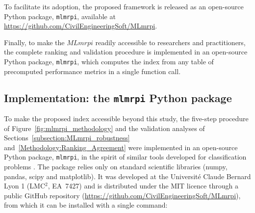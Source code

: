 
To facilitate its adoption, the proposed framework is released as an open-source
Python package, \texttt{mlmrpi}, available at
\url{https://github.com/CivilEngineeringSoft/MLmrpi}.

Finally, to make the $MLmrpi$ readily accessible to researchers and practitioners,
the complete ranking and validation procedure is implemented in an open-source
Python package, \texttt{mlmrpi}, which computes the index from any table of
precomputed performance metrics in a single function call.

\subsection{Implementation: the \texttt{mlmrpi} Python package}\label{Methodology:MLmrpi_package}

To make the proposed index accessible beyond this study, the five-step procedure
of Figure~\ref{fig:mlmrpi_methodology} and the validation analyses of
Sections~\ref{subsection:MLmrpi_robustness} and~\ref{Methodology:Ranking_Agreement}
were implemented in an open-source Python package, \texttt{mlmrpi}, in the spirit
of similar tools developed for classification problems \citep{Akshay2023}. The
package relies only on standard scientific libraries (numpy, pandas, scipy and
matplotlib). It was developed at the Université Claude Bernard Lyon 1 (LMC$^2$,
EA~7427) and is distributed under the MIT licence through a public GitHub
repository (\url{https://github.com/CivilEngineeringSoft/MLmrpi}), from which it can be
installed with a single command:

